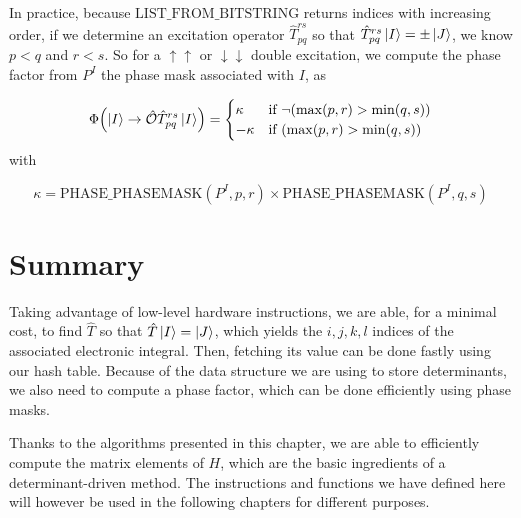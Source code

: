 \documentclass[./thesis.tex]{subfiles}
\begin{document}
In practice, because $\text{LIST\_FROM\_BITSTRING}$ returns indices with increasing order, if we determine an excitation operator $\hat T_{pq}^{rs}$ so that $\hat T_{pq}^{rs} \ket I = \pm \ket J$, we know $p<q$ and $r<s$. So for a $\uparrow \uparrow$ or $\downarrow \downarrow$ double excitation, we compute the phase factor from $P^I$ the phase mask associated with $I$, as



\begin{align}
{\Phi \qty(\ket I \rightarrow {\hat{\mathcal{O}}}\hat T_{pq}^{rs} \ket I)} = 
\begin{cases}
\kappa & \text{if } \neg \qty( \max(p,r) > \min(q,s) ) \\
-\kappa & \text{if } \qty( \max(p,r) > \min(q,s) )
\end{cases}
\end{align}
with 

\begin{equation}
\kappa = \text{PHASE\_PHASEMASK}(P^I, p,r) \times \text{PHASE\_PHASEMASK}(P^I, q,s)
\end{equation}
\section{Summary}



Taking advantage of low-level hardware instructions, we are able, for a minimal cost, to find $\hat T$ so that $\hat T \ket I = \ket J$, which yields the $i,j,k,l$ indices of the associated electronic integral. Then, fetching its value can be done fastly using our hash table.
Because of the data structure we are using to store determinants, we also need to compute a phase factor, which can be done efficiently using phase masks. 

Thanks to the algorithms presented in this chapter, we are able to efficiently compute the matrix elements of $H$, which are the basic ingredients of a determinant-driven method. The instructions and functions we have defined here will however be used in the following chapters for different purposes.
\end{document}
